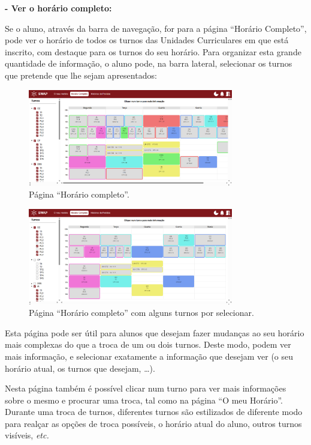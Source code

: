 \documentclass[12pt, a4paper]{article}
\begin{document}
\textbf{- Ver o horário completo:}

Se o aluno, através da barra de navegação, for para a página ``Horário Completo'', pode ver o
horário de todos os turnos das Unidades Curriculares em que está inscrito, com destaque para os
turnos do seu horário. Para organizar esta grande quantidade de informação, o aluno pode, na barra
lateral, selecionar os turnos que pretende que lhe sejam apresentados:

\begin{figure}[H]
    \centering
    \includegraphics[width=0.8\textwidth]{res/manual/horario_completo.png}
    \caption{Página ``Horário completo''.}
    \label{horario_completo}
\end{figure}

\begin{figure}[H]
    \centering
    \includegraphics[width=0.8\textwidth]{res/manual/horario_completo_filtrado.png}
    \caption{Página ``Horário completo'' com alguns turnos por selecionar.}
    \label{horario_completo_filtrado}
\end{figure}

Esta página pode ser útil para alunos que desejam fazer mudanças ao seu horário mais complexas do
que a troca de um ou dois turnos. Deste modo, podem ver mais informação, e selecionar exatamente a
informação que desejam ver (o seu horário atual, os turnos que desejam, \ldots).

Nesta página também é possível clicar num turno para ver mais informações sobre o mesmo e procurar
uma troca, tal como na página ``O meu Horário''. Durante uma troca de turnos, diferentes turnos
são estilizados de diferente modo para realçar as opções de troca possíveis, o horário atual do
aluno, outros turnos visíveis, \emph{etc.}
\end{document}

